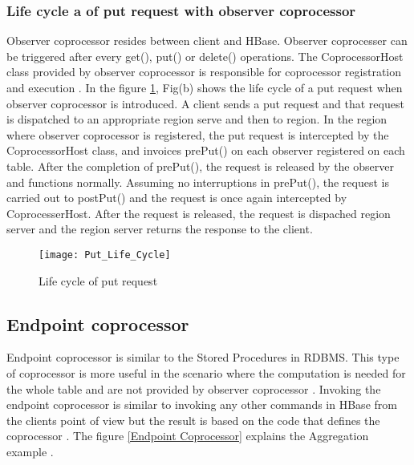 \documentclass[11pt,a4paper,bibtotoc,idxtotoc,headsepline,footsepline,footexclude,BCOR12mm,DIV13]{scrbook}
\begin{document}
\subsubsection{Life cycle a of put request with observer coprocessor}
\label{subsubsec:Life cycle of put request with observer coprocessor}

Observer coprocessor resides between client and HBase. Observer coprocesser can be triggered after every get(), put() or delete() operations. The CoprocessorHost class provided by observer coprocessor is responsible for coprocessor registration and execution \cite{coprocessor:detail}. In the figure \ref{Life cycle of put request}, Fig(b) shows the life cycle of a put request when observer coprocessor is introduced. A client sends a put request and that request is dispatched to an appropriate region serve and then to region. In the region where observer coprocessor is registered, the put request is intercepted by the CoprocessorHost class, and invoices prePut() on each observer registered on each table. After the completion of prePut(), the request is released by the observer and functions normally. Assuming no interruptions in prePut(), the request is carried out to postPut() and the request is once again intercepted by CoprocesserHost. After the request is released, the request is dispached region server and the region server returns the response to the client.

\begin{figure}
	\centering
	\texttt{[image: Put\_Life\_Cycle]}
	\caption{Life cycle of put request}
	\label{Life cycle of put request}
	
\end{figure}


%	
%
%    

\newpage
\subsection{Endpoint coprocessor}

Endpoint coprocessor is similar to the Stored Procedures in RDBMS. This type of coprocessor is more useful in the scenario where the computation is needed for the whole table and are not provided by observer coprocessor \cite{hbase:coprocessors}. Invoking the endpoint coprocessor is similar to invoking any other commands in HBase from the client\textquotesingle s point of view but the result is based on the code that defines the coprocessor \cite{coprocessor:detail}. The figure \ref{Endpoint Coprocessor} explains the Aggregation example \cite{coprocessor:detail}.
\end{document}
